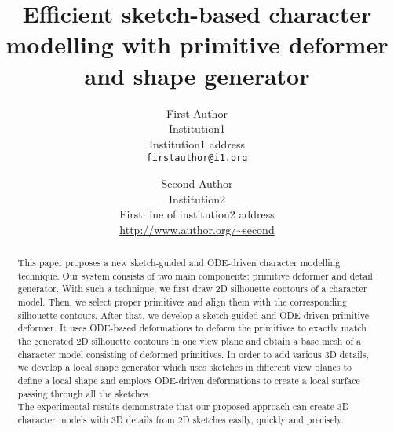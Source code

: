 \documentclass[10pt,twocolumn,letterpaper]{article}
\begin{document}
\title{Efficient sketch-based character modelling with primitive deformer and shape generator}

\author{First Author\\
Institution1\\
Institution1 address\\
{\tt\small firstauthor@i1.org}
\and
Second Author\\
Institution2\\
First line of institution2 address\\
{\small\url{http://www.author.org/~second}}
}

\maketitle

\begin{abstract}
This paper proposes a new sketch-guided and ODE-driven character modelling technique. Our system consists of two main components: primitive deformer and detail generator. With such a technique, we first draw 2D silhouette contours of a character model. Then, we select proper primitives and align them with the corresponding silhouette contours. After that, we develop a sketch-guided and ODE-driven primitive deformer. It uses ODE-based deformations to deform the primitives to exactly match the generated 2D silhouette contours in one view plane and obtain a base mesh of a character model consisting of deformed primitives. In order to add various 3D details, we develop a local shape generator which uses sketches in different view planes to define a local shape and employs ODE-driven deformations to create a local surface passing through all the sketches. \\
The experimental results demonstrate that our proposed approach can create 3D character models with 3D details from 2D sketches easily, quickly and precisely.
\\
\end{abstract}

\end{document}
